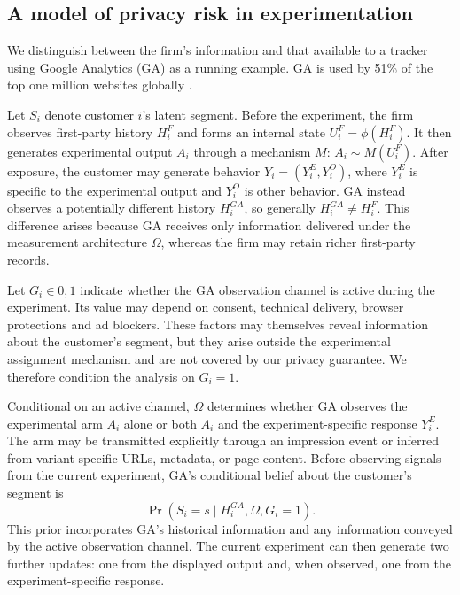 \documentclass[mksc,nonblindrev]{informs3}
\begin{document}
\ACKNOWLEDGMENT{%
}%
\newpage
\begin{APPENDICES}
\section{A model of privacy risk in experimentation}\label{modelprivacyrisk}
We distinguish between the firm's information and that available to a tracker using Google Analytics (GA) as a running example. GA is used by 51\% of the top one million websites globally \citep{lee2026_google_analytics_statistics}.

Let \(S_i\) denote customer \(i\)'s latent segment. Before the experiment, the firm observes first-party history \(H_i^F\) and forms an internal state $U_i^F=\phi(H_i^F).$ It then generates experimental output \(A_i\) through a mechanism \(M\): $A_i\sim M(U_i^F).$ After exposure, the customer may generate behavior \(Y_i=(Y_i^E,Y_i^O)\), where \(Y_i^E\) is specific to the experimental output and \(Y_i^O\) is other behavior. GA instead observes a potentially different history \(H_i^{GA}\), so generally $H_i^{GA}\neq H_i^F.$ This difference arises because GA receives only information delivered under the measurement architecture \(\Omega\), whereas the firm may retain richer first-party records. 

Let \(G_i\in{0,1}\) indicate whether the GA observation channel is active during the experiment. Its value may depend on consent, technical delivery, browser protections and ad blockers. These factors may themselves reveal information about the customer's segment, but they arise outside the experimental assignment mechanism and are not covered by our privacy guarantee. We therefore condition the analysis on \(G_i=1\).

Conditional on an active channel, \(\Omega\) determines whether GA observes the experimental arm \(A_i\) alone or both \(A_i\) and the experiment-specific response \(Y_i^E\). The arm may be transmitted explicitly through an impression event or inferred from variant-specific URLs, metadata, or page content. Before observing signals from the current experiment, GA's conditional belief about the customer's segment is
\[
\Pr(S_i=s\mid H_i^{GA},\Omega,G_i=1).
\]
This prior incorporates GA's historical information and any information conveyed by the active observation channel. The current experiment can then generate two further updates: one from the displayed output and, when observed, one from the experiment-specific response.


\end{APPENDICES}
\end{document}
